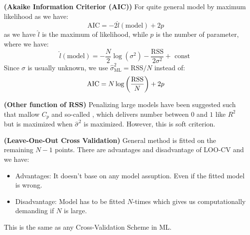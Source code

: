 \begin{remark}{\textbf{(Akaike Information Criterior (AIC))}}
    For quite general model by maximum likelihood as we have:
    \begin{equation*}
        \text{AIC} = -2\hat{l}(\text{model}) + 2p
    \end{equation*}
    as we have $\hat{l}$ is the maximum of likelihood, while $p$ is the number of parameter, where we have:
    \begin{equation*}
        \hat{l}(\text{model}) = -\frac{N}{2}\log(\sigma^2) - \frac{\text{RSS}}{2\sigma^2} + \text{ const }
    \end{equation*}
    Since $\sigma$ is usually unknown, we use $\hat{\sigma}^2_\text{ML} = \text{RSS}/N$ instead of:
    \begin{equation*}
        \text{AIC} = N\log\left( \frac{\text{RSS}}{N} \right) + 2p
    \end{equation*}
\end{remark}

\begin{remark}{\textbf{(Other function of RSS)}}
    Penalizing large models have been suggested such that mallow $C_p$ and so-called , which delivers number between $0$ and $1$ like $R^2$ but is maximized when $\hat{\sigma}^2$ is maximized. However, this is soft criterion. 
\end{remark}

\begin{remark}{\textbf{(Leave-One-Out Cross Validation)}}
    General method is fitted on the remaining $N-1$ points. There are advantages and disadvantage of LOO-CV and we have:
    \begin{itemize}
        \item Advantages: It doesn't base on any model assuption. Even if the fitted model is wrong. 
        \item Disadvantage: Model has to be fitted $N$-times which gives us computationally demanding if $N$ is large. 
    \end{itemize}
    This is the same as any Cross-Validation Scheme in ML. 
\end{remark}

